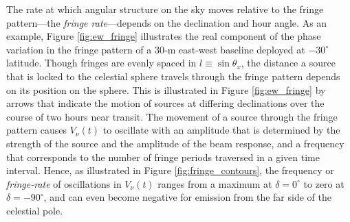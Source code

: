 \documentclass[twocolumn,apj,numberedappendix]{emulateapj}
\begin{document}
The rate at which angular structure on the sky moves relative to the fringe pattern---the \emph{fringe rate}---depends on the declination and hour angle. 
%
%
As an example, Figure \ref{fig:ew_fringe} illustrates the real component of the phase
variation in the fringe pattern of a 30-m east-west baseline deployed at $-30^\circ$ latitude.
Though fringes are evenly spaced in $l\equiv\sin\theta_x$, the distance a source that is locked to the celestial
sphere travels through the fringe pattern depends on its position on the sphere. This is illustrated in Figure
\ref{fig:ew_fringe} by arrows that indicate the motion of sources at differing declinations over the course
of two hours near transit.  The movement of a source through the fringe pattern causes $V_\nu(t)$ to oscillate
with an amplitude that is determined by the strength of the source and the amplitude of the beam response,
and a frequency that corresponds to the number of fringe periods traversed in a given time interval.  Hence,
as illustrated in Figure \ref{fig:fringe_contours}, the frequency or {\it fringe-rate} of oscillations in $V_\nu(t)$
ranges from a maximum at $\delta=0^\circ$ to zero at $\delta=-90^\circ$, and can even become negative
for emission from the far side of the celestial pole.
\end{document}
